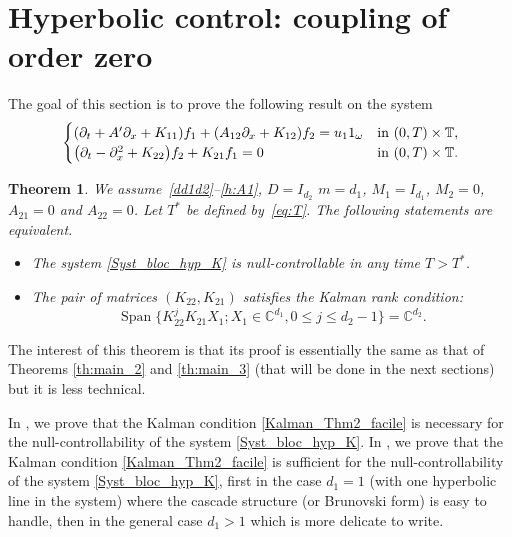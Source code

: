 \documentclass[10pt]{amsart}
\theoremstyle{plain}
\newtheorem{theorem}{Theorem}
\theoremstyle{definition}
\theoremstyle{remark}
\DeclareMathOperator{\Span}{Span}
\newcommand{\set}{\mathbb}
\renewcommand{\C}{\set{C}}
\newcommand{\T}{\set{T}}
\let\originalleft\left
\let\originalright\right
\renewcommand{\left}{\mathopen{}\mathclose\bgroup\originalleft}
\renewcommand{\right}{\aftergroup\egroup\originalright}
\begin{document}
\section{Hyperbolic control: coupling of order zero}
\label{sec:cont_parab_simple}

The goal of this section is to prove the following result on the system
\begin{equation} \label{Syst_bloc_hyp_K}
\begin{cases}
\left(\partial_t +A'\partial_x+K_{11}\right)f_1+\left(A_{12}\partial_x+K_{12}\right)f_2= u_1 1_\omega
&\text{in}\ (0,T)\times \T,\!\\
\left(\partial_t -\partial_x^2+K_{22}\right)f_2 + K_{21} f_1 = 0 &\text{in}\ (0,T)\times \T.\!\\
\end{cases}
\end{equation}

\begin{theorem} \label{th:main_2_facile}
We assume~\eqref{dd1d2}--\eqref{h:A1}, $D\!=\!I_{d_2}$ $m\!=\!d_1$, $M_1\!=\!I_{d_1}$, $M_2\!=\!0$, $A_{21}\!=\!0$ and $A_{22}=0$. Let $T^\ast$ be defined by~\eqref{eq:T}.
The following statements are equivalent.
\begin{itemize}
\item The system \eqref{Syst_bloc_hyp_K} is null-controllable in any time $T>T^{\ast}$.
\item The pair of matrices $(K_{22},K_{21})$ satisfies the Kalman rank condition:
\begin{equation} \label{Kalman_Thm2_facile}
\Span \{ K_{22}^j K_{21} X_1 ; X_1 \in \C^{d_1}, 0 \leq j \leq d_2-1 \} = \C^{d_2}.
\end{equation}
\end{itemize}
\end{theorem}

The interest of this theorem is that its proof is essentially the same as that of Theorems \ref{th:main_2} and \ref{th:main_3} (that will be done in the next sections) but it is less technical.

In , we prove that the Kalman condition \eqref{Kalman_Thm2_facile} is necessary for the null-controllability of the system \eqref{Syst_bloc_hyp_K}. In , we prove that the Kalman condition \eqref{Kalman_Thm2_facile} is sufficient for the null-controllability of the system \eqref{Syst_bloc_hyp_K}, first in the case $d_1=1$ (\ie with one hyperbolic line in the system) where the cascade structure (or Brunovski form) is easy to handle, then in the general case $d_1>1$ which is more delicate to write.
\end{document}
